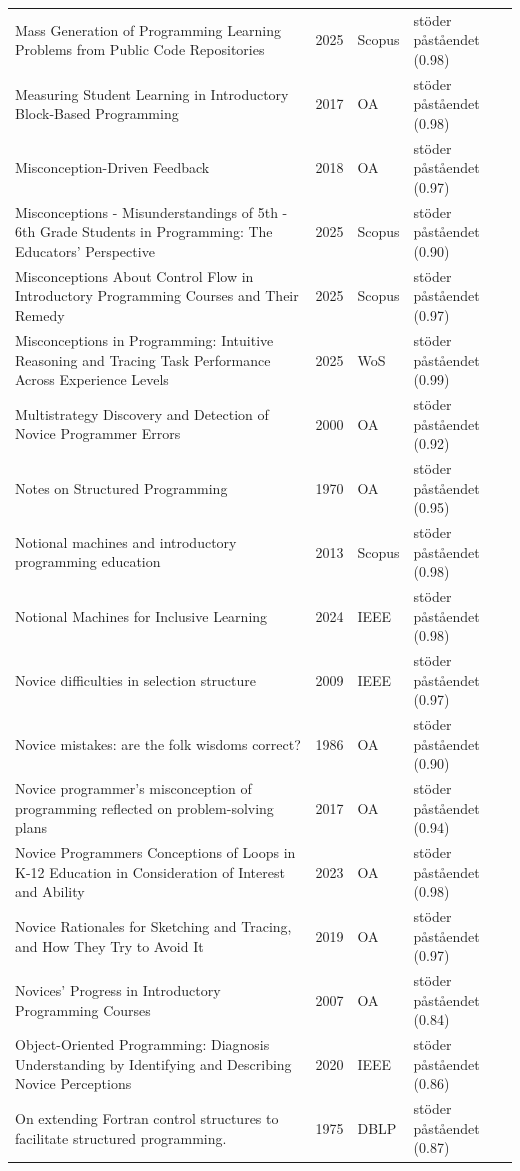 \begin{longtable}{@{}%
  >{\raggedright\arraybackslash}p{}c%
  >{\raggedright\arraybackslash}p{}%
  >{\raggedright\arraybackslash}p{}@{}}
Mass Generation of Programming Learning Problems from Public Code Repositories & 2025 & Scopus & stöder påståendet (0.98) \\
Measuring Student Learning in Introductory Block-Based Programming & 2017 & OA & stöder påståendet (0.98) \\
Misconception-Driven Feedback & 2018 & OA & stöder påståendet (0.97) \\
Misconceptions - Misunderstandings of 5th - 6th Grade Students in Programming: The Educators' Perspective & 2025 & Scopus & stöder påståendet (0.90) \\
Misconceptions About Control Flow in Introductory Programming Courses and Their Remedy & 2025 & Scopus & stöder påståendet (0.97) \\
Misconceptions in Programming: Intuitive Reasoning and Tracing Task Performance Across Experience Levels & 2025 & WoS & stöder påståendet (0.99) \\
Multistrategy Discovery and Detection of Novice Programmer Errors & 2000 & OA & stöder påståendet (0.92) \\
Notes on Structured Programming & 1970 & OA & stöder påståendet (0.95) \\
Notional machines and introductory programming education & 2013 & Scopus & stöder påståendet (0.98) \\
Notional Machines for Inclusive Learning & 2024 & IEEE & stöder påståendet (0.98) \\
Novice difficulties in selection structure & 2009 & IEEE & stöder påståendet (0.97) \\
Novice mistakes: are the folk wisdoms correct? & 1986 & OA & stöder påståendet (0.90) \\
Novice programmer's misconception of programming reflected on problem-solving plans & 2017 & OA & stöder påståendet (0.94) \\
Novice Programmers Conceptions of Loops in K-12 Education in Consideration of Interest and Ability & 2023 & OA & stöder påståendet (0.98) \\
Novice Rationales for Sketching and Tracing, and How They Try to Avoid It & 2019 & OA & stöder påståendet (0.97) \\
Novices' Progress in Introductory Programming Courses & 2007 & OA & stöder påståendet (0.84) \\
Object-Oriented Programming: Diagnosis Understanding by Identifying and Describing Novice Perceptions & 2020 & IEEE & stöder påståendet (0.86) \\
On extending Fortran control structures to facilitate structured programming. & 1975 & DBLP & stöder påståendet (0.87) \\

\end{longtable}
